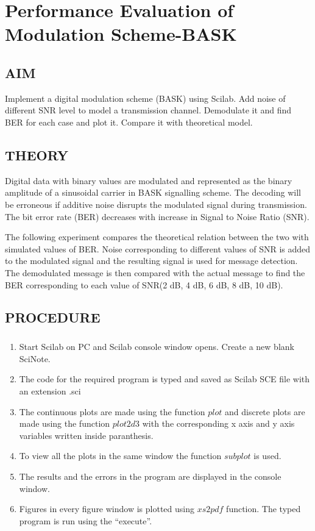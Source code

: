 \chapter [Performance Comparison of Modulation Scheme-BASK]{Performance Evaluation of Modulation Scheme-BASK}


\section{AIM}

Implement a digital modulation scheme (BASK) using Scilab. Add noise of different SNR level to model a transmission channel. Demodulate it and find BER for each case and plot it. Compare it with theoretical model.


\section{THEORY}

Digital data with binary values are modulated and represented as the binary amplitude of a sinusoidal carrier in BASK signalling scheme. The decoding will be erroneous if additive noise disrupts the modulated signal during transmission. The bit error rate (BER) decreases with increase in Signal to Noise Ratio (SNR). 

The following experiment compares the theoretical relation between the two with simulated values of BER. Noise corresponding to different values of SNR is added to the modulated signal and the resulting signal is used for message detection. The demodulated message is then compared with the actual message to find the BER corresponding to each value of SNR(2 dB, 4 dB, 6 dB, 8 dB, 10 dB).

\section{PROCEDURE}

\paragraph{}
\begin{enumerate}
\item
Start Scilab on PC and Scilab console window opens. Create a new blank SciNote.
\item
The code for the required program is typed and saved as Scilab SCE file with an extension .sci
\item

The continuous plots are made using the function $plot$ and discrete plots are made using the function $plot2d3$ with the corresponding x axis and y axis variables written inside paranthesis.

\item
To view all the plots in the same window the function $subplot$ is used.
\item
The results and the errors in the program are displayed in the console window.
\item
Figures in every figure window is plotted using $xs2pdf$ function.
The typed program is run using the “execute”.
\end{enumerate}

